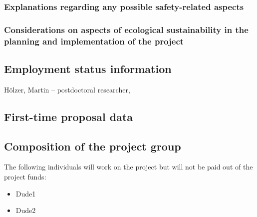 \documentclass{scrartcl}
\begin{document}
\subsubsection{Explanations regarding any possible safety-related aspects}



\subsubsection{Considerations on aspects of ecological sustainability in the planning and implementation of the project}

\subsection{Employment status information}
H\"olzer, Martin -- postdoctoral researcher, 

\subsection{First-time proposal data}

\subsection{Composition of the project group}
The following individuals will work on the project but will not be paid out of
the project funds:

\begin{itemize}
	\item Dude1
	\item Dude2
\end{itemize}
\end{document}

